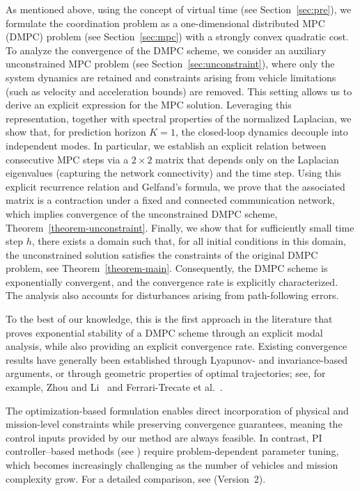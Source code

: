 \documentclass[letterpaper,journal]{IEEEtran}
\begin{document}
As mentioned above, using the concept of virtual time (see Section~\ref{sec:pre}), we formulate the coordination problem as a one-dimensional distributed MPC (DMPC) problem (see Section~\ref{sec:mpc}) with a strongly convex quadratic cost. 
To analyze the convergence of the DMPC scheme, we consider an auxiliary unconstrained MPC problem (see Section~\ref{sec:unconstraint}), where only the system dynamics are retained and constraints arising from vehicle limitations (such as velocity and acceleration bounds) are removed. This setting allows us to derive an explicit expression for the MPC solution. 
Leveraging this representation, together with spectral properties of the normalized Laplacian, we show that, for prediction horizon $K=1$, the closed-loop dynamics decouple into independent modes. In particular, we establish an explicit relation between consecutive MPC steps via a $2\times 2$ matrix that depends only on the Laplacian eigenvalues (capturing the network connectivity) and the time step. 
Using this explicit recurrence relation and Gelfand’s formula, we prove that the associated matrix is a contraction under a fixed and connected communication network, which implies convergence of the unconstrained DMPC scheme, Theorem~\ref{theorem-unconstraint}. 
Finally, we show that for sufficiently small time step $h$, there exists a domain such that, for all initial conditions in this domain, the unconstrained solution satisfies the constraints of the original DMPC problem, see Theorem~\ref{theorem-main}. Consequently, the DMPC scheme is exponentially convergent, and the convergence rate is explicitly characterized. The analysis also accounts for disturbances arising from path-following errors. 

To the best of our knowledge, this is the first approach in the literature that proves exponential stability of a DMPC scheme through an explicit modal analysis, while also providing an explicit convergence rate. Existing convergence results have generally been established through Lyapunov- and invariance-based arguments, or through geometric properties of optimal trajectories; see, for example, Zhou and Li~\cite{zhou2015distributed} and Ferrari-Trecate et al.~\cite{ferrari2009consensus}.

The optimization-based formulation enables direct incorporation of physical and mission-level constraints while preserving convergence guarantees, meaning the control inputs provided by our method are always feasible. In contrast, PI controller–based methods (see \cite{kaminer2017time}) require problem-dependent parameter tuning, which becomes increasingly challenging as the number of vehicles and mission complexity grow. For a detailed comparison, see \cite{paper} (Version~2).
\end{document}
